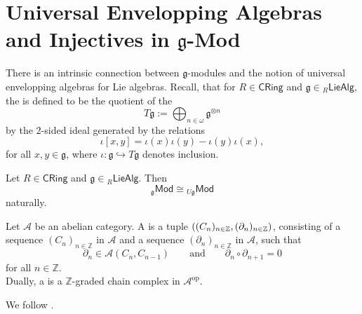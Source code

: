 \section*{Universal Envelopping Algebras and Injectives in $\mathfrak{g}$-Mod}
There is an intrinsic connection between $\mathfrak{g}$-modules and the notion of universal envelopping algebras for Lie algebras. Recall, that for $R \in \mathsf{CRing}$ and $\mathfrak{g} \in {_{R}\mathsf{LieAlg}}$, the  is defined to be the quotient of the 
\begin{equation*}
	T\mathfrak{g} := \bigoplus_{n \in \omega} \mathfrak{g}^{\otimes n}
\end{equation*}
\noindent by the $2$-sided ideal generated by the relations
\begin{equation*}
	\iota[x,y] = \iota(x)\iota(y) - \iota(y)\iota(x),
\end{equation*}
\noindent for all $x,y \in \mathfrak{g}$, where $\iota : \mathfrak{g} \hookrightarrow T\mathfrak{g}$ denotes inclusion. 

\begin{theorem}
	\label{thm:universal_envelopping_algebra}
	Let $R \in \mathsf{CRing}$ and $\mathfrak{g} \in {_{R}\mathsf{LieAlg}}$. Then 
	\begin{equation*}
		_{\mathfrak{g}}\mathsf{Mod} \cong {_{U\mathfrak{g}}}\mathsf{Mod}
	\end{equation*}
	\noindent naturally.
\end{theorem}

\begin{definition}
	Let $\mathcal{A}$ be an abelian category. A  is a tuple $\del[0]{(C_n)_{n \in \mathbb{Z}},(\partial_n)_{n \in \mathbb{Z}}}$, consisting of a sequence $(C_n)_{n \in \mathbb{Z}}$ in $\mathcal{A}$ and a sequence $(\partial_n)_{n \in \mathbb{Z}}$ in $\mathcal{A}$, such that 
	\begin{equation*}
		\partial_n \in \mathcal{A}(C_n,C_{n - 1}) \qquad \text{and} \qquad \partial_n \circ \partial_{n + 1} = 0
	\end{equation*}
	\noindent for all $n \in \mathbb{Z}$.\\
	Dually, a  is a $\mathbb{Z}$-graded chain complex in $\mathcal{A}^\mathrm{op}$. 
\end{definition}

We follow \cite[178]{kashiwara:categories:2006}.

